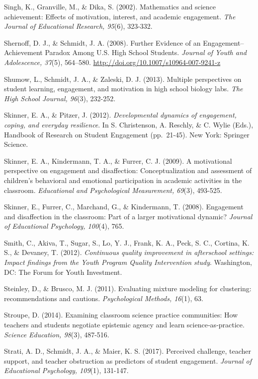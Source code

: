 \documentclass[]{msu-thesis}
\theoremstyle{definition}
\theoremstyle{definition}
\theoremstyle{definition}
\theoremstyle{remark}
\begin{document}
Singh, K., Granville, M., \& Dika, S. (2002). Mathematics and science
achievement: Effects of motivation, interest, and academic engagement.
\emph{The Journal of Educational Research, 95}(6), 323-332.

Shernoff, D. J., \& Schmidt, J. A. (2008). Further Evidence of an
Engagement--Achievement Paradox Among U.S. High School Students.
\emph{Journal of Youth and Adolescence, 37}(5), 564--580.
\url{http://doi.org/10.1007/s10964-007-9241-z}

Shumow, L., Schmidt, J. A., \& Zaleski, D. J. (2013). Multiple
perspectives on student learning, engagement, and motivation in high
school biology labs. \emph{The High School Journal, 96}(3), 232-252.

Skinner, E. A., \& Pitzer, J. (2012). \emph{Developmental dynamics of
engagement, coping, and everyday resilience}. In S. Christenson, A.
Reschly, \& C. Wylie (Eds.), Handbook of Research on Student Engagement
(pp.~21-45). New York: Springer Science.

Skinner, E. A., Kindermann, T. A., \& Furrer, C. J. (2009). A
motivational perspective on engagement and disaffection:
Conceptualization and assessment of children's behavioral and emotional
participation in academic activities in the classroom. \emph{Educational
and Psychological Measurement, 69}(3), 493-525.

Skinner, E., Furrer, C., Marchand, G., \& Kindermann, T. (2008).
Engagement and disaffection in the classroom: Part of a larger
motivational dynamic? \emph{Journal of Educational Psychology, 100}(4),
765.

Smith, C., Akiva, T., Sugar, S., Lo, Y. J., Frank, K. A., Peck, S. C.,
Cortina, K. S., \& Devaney, T. (2012). \emph{Continuous quality
improvement in afterschool settings: Impact findings from the Youth
Program Quality Intervention study}. Washington, DC: The Forum for Youth
Investment.

Steinley, D., \& Brusco, M. J. (2011). Evaluating mixture modeling for
clustering: recommendations and cautions. \emph{Psychological Methods,
16}(1), 63.

Stroupe, D. (2014). Examining classroom science practice communities:
How teachers and students negotiate epistemic agency and learn
science‐as‐practice. \emph{Science Education, 98}(3), 487-516.

Strati, A. D., Schmidt, J. A., \& Maier, K. S. (2017). Perceived
challenge, teacher support, and teacher obstruction as predictors of
student engagement. \emph{Journal of Educational Psychology, 109}(1),
131-147.
\end{document}
